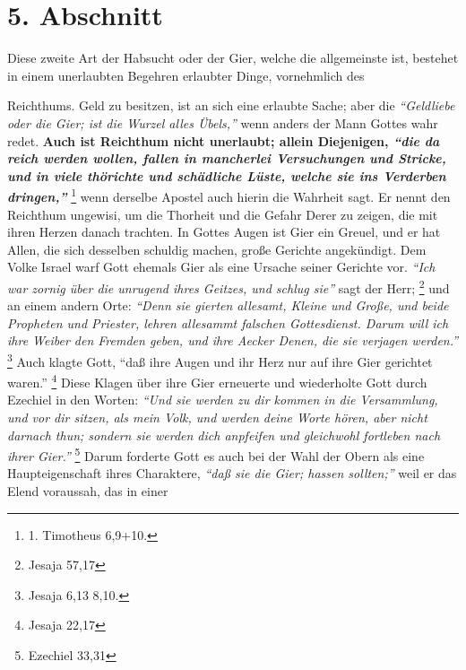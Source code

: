 \section{5. Abschnitt} \label{kap13_ab5}

Diese zweite Art der Habsucht oder der Gier, welche die allgemeinste ist,
bestehet in einem unerlaubten Begehren erlaubter Dinge, vornehmlich des

 Reichthums. Geld zu besitzen, ist an sich eine erlaubte Sache; aber die
\textit{"`Geldliebe oder die Gier; ist die Wurzel alles Übels,"'} wenn anders der Mann
Gottes wahr redet. \textbf{Auch ist Reichthum nicht unerlaubt; allein Diejenigen,
\textit{"`die da reich werden wollen, fallen in mancherlei Versuchungen und Stricke, und in
viele thörichte und schädliche Lüste, welche sie ins Verderben
dringen,"'}}
\footnote{1. Timotheus 6,9+10.}
wenn derselbe Apostel auch hierin die
Wahrheit sagt. Er nennt den Reichthum ungewisi, um die Thorheit und die Gefahr
Derer zu zeigen, die mit ihren Herzen danach trachten. In Gottes Augen ist
Gier ein Greuel, und er hat Allen, die sich desselben schuldig machen, große
Gerichte angekündigt. Dem Volke Israel warf Gott ehemals Gier als eine
Ursache seiner Gerichte vor.
\textit{"`Ich war zornig über die unrugend ihres Geitzes,
und schlug sie"'} sagt der Herr;
\footnote{Jesaja 57,17}
und an einem andern Orte:
\textit{"`Denn sie gierten allesamt, Kleine und Große, und beide Propheten und
Priester, lehren allesammt falschen Gottesdienst. Darum will ich ihre Weiber den
Fremden geben, und ihre Aecker Denen, die sie verjagen werden."'}
\footnote{Jesaja 6,13 8,10.}
Auch klagte Gott,
"`daß ihre Augen und ihr Herz nur auf ihre Gier
gerichtet waren."'
\footnote{Jesaja 22,17}
Diese Klagen über ihre Gier erneuerte
und wiederholte Gott durch Ezechiel in den Worten:
\textit{"`Und sie werden zu dir
kommen in die Versammlung, und vor dir sitzen, als mein Volk, und werden deine
Worte hören, aber nicht darnach thun; sondern sie werden dich anpfeifen und
gleichwohl fortleben nach ihrer Gier."'}
\footnote{Ezechiel 33,31}
Darum forderte
Gott es auch bei der Wahl der Obern als eine Haupteigenschaft ihres Charaktere,
\textit{"`daß sie die Gier; hassen sollten;"'} weil er das Elend voraussah, das in einer
